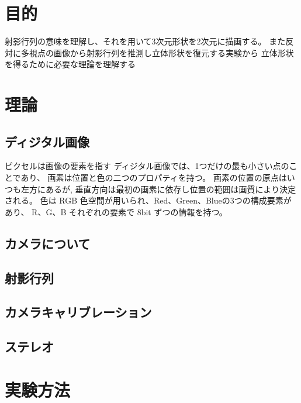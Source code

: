 \documentclass[11pt,a4j]{jsarticle}
\begin{document}


\section{目的}
射影行列の意味を理解し、それを用いて3次元形状を2次元に描画する。
また反対に多視点の画像から射影行列を推測し立体形状を復元する実験から
立体形状を得るために必要な理論を理解する


\section{理論}
\label{sec:理論}

\subsection{ディジタル画像}
\label{sub:ディジタル画像}
ピクセルは画像の要素を指す
ディジタル画像では、1つだけの最も小さい点のことであり、
画素は位置と色の二つのプロパティを持つ。 画素の位置の原点はいつも左方にあるが,
垂直方向は最初の画素に依存し位置の範囲は画質により決定される。
色は RGB 色空間が用いられ、Red、Green、Blueの3つの構成要素があり、
R、G、B それぞれの要素で 8bit ずつの情報を持つ。

\subsection{カメラについて}
\label{sub:カメラについて}

\subsection{射影行列}
\label{sub:射影行列}

\subsection{カメラキャリブレーション}
\label{sub:カメラキャリブレーション}

\subsection{ステレオ}
\label{sub:ステレオ}

\section{実験方法}
\label{sec:実験方法}
\end{document}
